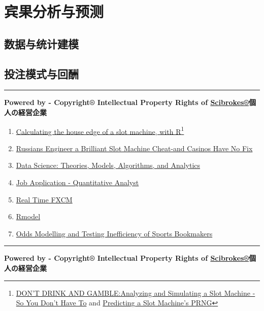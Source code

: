 \documentclass[]{book}
\providecommand{\tightlist}{%
  \setlength{\itemsep}{0pt}\setlength{\parskip}{0pt}}
\let\rmarkdownfootnote\footnote%
\def\footnote{\protect\rmarkdownfootnote}
\theoremstyle{definition}
\theoremstyle{definition}
\theoremstyle{definition}
\theoremstyle{remark}
\begin{document}
\section{宾果分析与预测}

\hypertarget{-3}{%
\subsection{数据与统计建模}\label{-3}}

\hypertarget{-3}{%
\subsection{投注模式与回酬}\label{-3}}

\begin{center}\rule{0.5\linewidth}{\linethickness}\end{center}

\textbf{Powered by - Copyright® Intellectual Property Rights of
\href{http://www.scibrokes.com}{Scibrokes®}個人の経営企業}

\begin{enumerate}
\def\labelenumi{\arabic{enumi}.}
\tightlist
\item
  \href{https://www.r-bloggers.com/calculating-the-house-edge-of-a-slot-machine-with-r/}{Calculating
  the house edge of a slot machine, with R}\footnote{\href{http://giorasimchoni.com/2017/05/06/2017-05-06-don-t-drink-and-gamble/}{DON'T
    DRINK AND GAMBLE:Analyzing and Simulating a Slot Machine - So You
    Don't Have To} and
    \href{https://www.schneier.com/blog/archives/2017/02/predicting_a_sl.html}{Predicting
    a Slot Machine's PRNG}}
\item
  \href{https://www.wired.com/2017/02/russians-engineer-brilliant-slot-machine-cheat-casinos-no-fix/}{Russians
  Engineer a Brilliant Slot Machine Cheat-and Casinos Have No Fix}
\item
  \href{https://srdas.github.io/MLBook}{Data Science: Theories, Models,
  Algorithms, and Analytics}
\item
  \href{github.com/englianhu/binary.com-interview-question}{Job
  Application - Quantitative Analyst}
\item
  \href{https://github.com/scibrokes/real-time-fxcm}{Real Time FXCM}
\item
  \href{https://github.com/scibrokes/Rmodel}{Rmodel}
\item
  \href{https://github.com/scibrokes/odds-modelling-and-testing-inefficiency-of-sports-bookmakers}{Odds
  Modelling and Testing Inefficiency of Sports Bookmakers}
\end{enumerate}

\begin{center}\rule{0.5\linewidth}{\linethickness}\end{center}

\textbf{Powered by - Copyright® Intellectual Property Rights of
\href{http://www.scibrokes.com}{Scibrokes®}個人の経営企業}


\end{document}

